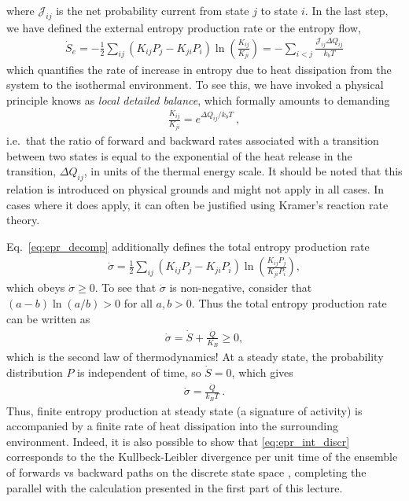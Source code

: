 %
where $\mathcal J_{ij}$ is the net probability current from state $j$ to state $i$.
In the last step, we have defined the external entropy production rate or the entropy flow,
%
\begin{align}
    \dot S_e = - \frac{1}{2}\sum_{ij}
        ( K_{ij}P_j - K_{ji} P_i) 
    \ln \left( \frac{K_{ij}}{K_{ji}}\right) = - \sum_{i<j} \frac{\mathcal J_{ij} \Delta Q_{ij}}{k_b T}
\end{align}
%
which quantifies the rate of increase in entropy due to heat dissipation from the system to the isothermal environment. To see this, we have invoked a physical principle knows as \emph{local detailed balance}, which formally amounts to demanding 
\begin{align}
    \frac{K_{ij}}{K_{ji}} = e^{\Delta Q_{ij} / k_b T}~,
\end{align}
i.e.\ that the ratio of forward and backward rates associated with a transition between two states is equal to the exponential of the heat release in the transition, $\Delta Q_{ij}$, in units of the thermal energy scale. It should be noted that this relation is introduced on physical grounds and might not apply in all cases. In cases where it does apply, it can often be justified using Kramer's reaction rate theory.

Eq.~\eqref{eq:epr_decomp} additionally defines the total entropy production rate
%
\begin{align}
    \dot \sigma = 
    \frac{1}{2}\sum_{ij}
    \left(K_{ij}P_j - K_{ji} P_i\right) 
    \ln \left( \frac{K_{ij}P_j}{K_{ji} P_i}\right), \label{eq:epr_int_discr}
\end{align}
%
which obeys $\dot \sigma \geq 0$. To see that $\dot \sigma$ is non-negative, consider that $(a-b)\ln(a/b) > 0$ for all $a,b>0$.
Thus the total entropy production rate can be written as 
%
\begin{align}
    \dot \sigma = \dot S + \frac{\dot Q}{K_B} \geq 0,
\end{align}
%
which is the second law of thermodynamics!
At a steady state, the probability distribution $P$ is independent of time, so $\dot S = 0$, which gives
%
\begin{align}
    \dot \sigma = \frac{\dot Q}{k_B T}~.
\end{align}
Thus, finite entropy production at steady state (a signature of activity) is accompanied by a finite rate of heat dissipation into the surrounding environment.
%
Indeed, it is also possible to show that \eqref{eq:epr_int_discr} corresponds to the the Kullbeck-Leibler divergence per unit time of the ensemble of forwards vs backward paths on the discrete state space \cite{gaspard2004time}, completing the parallel with the calculation presented in the first part of this lecture. 




